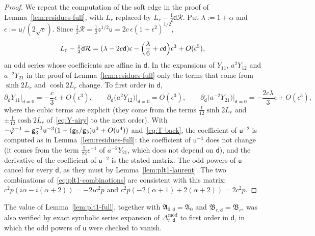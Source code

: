 \begin{proof}
We repeat the computation of the soft edge in the proof of Lemma~\ref{lem:residues-full}, with $L_r$ replaced by
$L_r-\frac12\mathsf d\mathcal R$. Put $\lambda:=1+\alpha$ and $\epsilon:=\mathsf u/(2\sqrt c)$. Since
$\frac12\mathcal R=\frac12z^{1/2}\mathsf u=2c\,\epsilon(1+\epsilon^2)^{1/2}$,
\[
  L_r-\tfrac12\mathsf d\mathcal R=(\lambda-2c\mathsf d)\epsilon-\Bigl(\frac\lambda6+c\mathsf d\Bigr)\epsilon^3+O(\epsilon^5),
\]
an odd series whose coefficients are affine in $\mathsf d$. In the expansions of $Y_{11}$, $a^2Y_{12}$ and
$a^{-2}Y_{21}$ in the proof of Lemma~\ref{lem:residues-full} only the terms that come from $\sinh2L_r$ and
$\cosh2L_r$ change. To first order in $\mathsf d$,
\[
  \partial_{\mathsf d}Y_{11}\big|_{\mathsf d=0}=-\frac c3\epsilon+O(\epsilon^3),\qquad
  \partial_{\mathsf d}\bigl(a^2Y_{12}\bigr)\big|_{\mathsf d=0}=O(\epsilon^3),\qquad
  \partial_{\mathsf d}\bigl(a^{-2}Y_{21}\bigr)\big|_{\mathsf d=0}=-\frac{2c\lambda}3\epsilon+O(\epsilon^3),
\]
where the cubic terms are explicit (they come from the terms $\frac1{12}\sinh2L_r$ and $\pm\frac1{12}\cosh2L_r$ of~\eqref{eq:Y-airy} to the next order). With
$-\tilde\varphi^{-1}=\mathsf g_3^{-1}\mathsf u^{-3}(1-(\mathsf g_5/\mathsf g_3)\mathsf u^2+O(\mathsf u^4))$ and~\eqref{eq:T-back}, the
coefficient of $\mathsf u^{-2}$ is computed as in Lemma~\ref{lem:residues-full}: the coefficient of $\mathsf u^{-4}$ does not
change (it comes from the term $\frac5{72}\epsilon^{-1}$ of $a^{-2}Y_{21}$, which does not depend on $\mathsf d$), and the
derivative of the coefficient of $\mathsf u^{-2}$ is the stated matrix. The odd powers of $\mathsf u$ cancel for every
$\mathsf d$, as they must by Lemma~\ref{lem:plt1-laurent}. The two combinations of~\eqref{eq:plt1-combinations} are
consistent with this matrix: $c^2p(i\alpha-i(\alpha+2))=-2ic^2p$ and
$c^2p(-2(\alpha+1)+2(\alpha+2))=2c^2p$.
\end{proof}

The value of Lemma~\ref{lem:plt1-full}, together with $\mathfrak A_{0,\mathsf d}=\mathfrak A_0$ and
$\mathfrak B_{r,\mathsf d}=\mathfrak B_r$, was also verified by exact symbolic series expansion of
$\Delta^{\mathrm{mod}}_{r,\mathsf d}$ to first order in $\mathsf d$, in which the odd powers of $\mathsf u$ were checked to
vanish.
